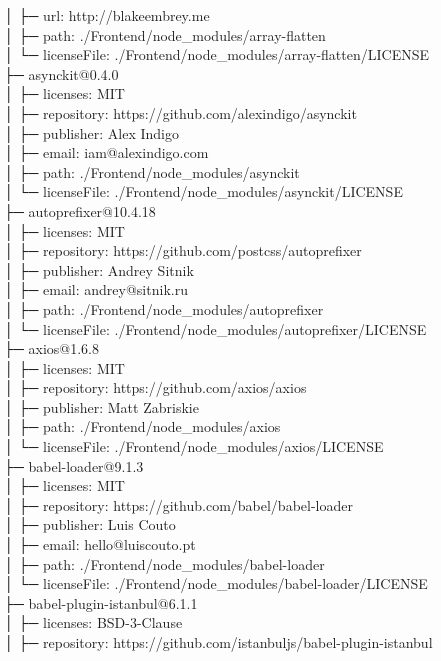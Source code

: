 │  ├─ url: http://blakeembrey.me\\
│  ├─ path: ./Frontend/node\_modules/array-flatten\\
│  └─ licenseFile: ./Frontend/node\_modules/array-flatten/LICENSE\\
├─ asynckit@0.4.0\\
│  ├─ licenses: MIT\\
│  ├─ repository: https://github.com/alexindigo/asynckit\\
│  ├─ publisher: Alex Indigo\\
│  ├─ email: iam@alexindigo.com\\
│  ├─ path: ./Frontend/node\_modules/asynckit\\
│  └─ licenseFile: ./Frontend/node\_modules/asynckit/LICENSE\\
├─ autoprefixer@10.4.18\\
│  ├─ licenses: MIT\\
│  ├─ repository: https://github.com/postcss/autoprefixer\\
│  ├─ publisher: Andrey Sitnik\\
│  ├─ email: andrey@sitnik.ru\\
│  ├─ path: ./Frontend/node\_modules/autoprefixer\\
│  └─ licenseFile: ./Frontend/node\_modules/autoprefixer/LICENSE\\
├─ axios@1.6.8\\
│  ├─ licenses: MIT\\
│  ├─ repository: https://github.com/axios/axios\\
│  ├─ publisher: Matt Zabriskie\\
│  ├─ path: ./Frontend/node\_modules/axios\\
│  └─ licenseFile: ./Frontend/node\_modules/axios/LICENSE\\
├─ babel-loader@9.1.3\\
│  ├─ licenses: MIT\\
│  ├─ repository: https://github.com/babel/babel-loader\\
│  ├─ publisher: Luis Couto\\
│  ├─ email: hello@luiscouto.pt\\
│  ├─ path: ./Frontend/node\_modules/babel-loader\\
│  └─ licenseFile: ./Frontend/node\_modules/babel-loader/LICENSE\\
├─ babel-plugin-istanbul@6.1.1\\
│  ├─ licenses: BSD-3-Clause\\
│  ├─ repository: https://github.com/istanbuljs/babel-plugin-istanbul\\
